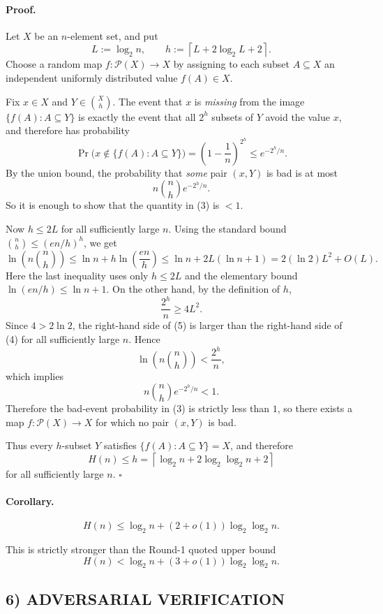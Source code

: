 \paragraph{Proof.}
Let $X$ be an $n$-element set, and put
\[
L:=\log_2 n,\qquad
h:=\left\lceil L+2\log_2 L+2\right\rceil.
\]
Choose a random map $f:\mathcal P(X)\to X$ by assigning to each subset $A\subseteq X$
an independent uniformly distributed value $f(A)\in X$.

Fix $x\in X$ and $Y\in \binom{X}{h}$.
The event that $x$ is \emph{missing} from the image $\{f(A):A\subseteq Y\}$ is exactly the event that
all $2^h$ subsets of $Y$ avoid the value $x$, and therefore has probability
\[
\Pr\bigl(x\notin \{f(A):A\subseteq Y\}\bigr)
=
\left(1-\frac1n\right)^{2^h}
\le e^{-2^h/n}.
\]
By the union bound, the probability that \emph{some} pair $(x,Y)$ is bad is at most
\[
n\binom{n}{h}e^{-2^h/n}.
\tag{3}
\]
So it is enough to show that the quantity in (3) is $<1$.

Now $h\le 2L$ for all sufficiently large $n$.
Using the standard bound $\binom{n}{h}\le (en/h)^h$, we get
\[
\ln\!\left(n\binom{n}{h}\right)
\le
\ln n + h\ln\!\left(\frac{en}{h}\right)
\le
\ln n + 2L(\ln n+1)
=
2(\ln 2)L^2 + O(L).
\tag{4}
\]
Here the last inequality uses only $h\le 2L$ and the elementary bound
$\ln(en/h)\le \ln n+1$.
On the other hand, by the definition of $h$,
\[
\frac{2^h}{n}\ge 4L^2.
\tag{5}
\]
Since $4>2\ln 2$, the right-hand side of (5) is larger than the right-hand side of (4) for all sufficiently large $n$.
Hence
\[
\ln\!\left(n\binom{n}{h}\right) < \frac{2^h}{n},
\]
which implies
\[
n\binom{n}{h}e^{-2^h/n}<1.
\]
Therefore the bad-event probability in (3) is strictly less than $1$, so there exists a map
$f:\mathcal P(X)\to X$ for which no pair $(x,Y)$ is bad.

Thus every $h$-subset $Y$ satisfies $\{f(A):A\subseteq Y\}=X$, and therefore
\[
H(n)\le h=\left\lceil \log_2 n + 2\log_2\log_2 n + 2\right\rceil
\]
for all sufficiently large $n$. \hfill $\square$

\paragraph{Corollary.}
\[
H(n)\le \log_2 n + (2+o(1))\log_2\log_2 n.
\]

This is strictly stronger than the Round-1 quoted upper bound
\[
H(n)<\log_2 n + (3+o(1))\log_2\log_2 n.
\]

\subsection*{6) ADVERSARIAL VERIFICATION}

